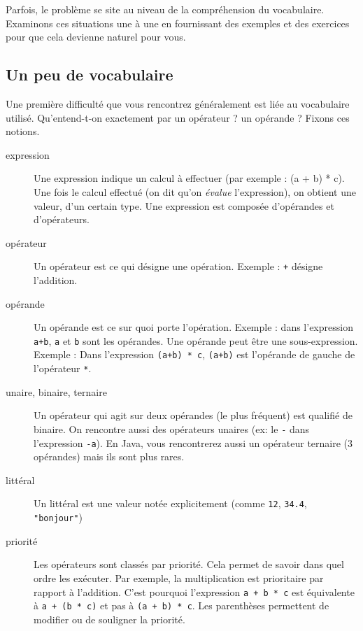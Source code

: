 		Parfois, le problème se site au niveau de la compréhension du vocabulaire.
		Examinons ces situations une à une
		en fournissant des exemples et des exercices
		pour que cela devienne naturel pour vous.

		\subsection{Un peu de vocabulaire}

			Une première difficulté que vous rencontrez généralement 
			est liée au vocabulaire utilisé. 
			Qu'entend-t-on exactement par un opérateur ? un opérande ? 
			Fixons ces notions.
			
			\begin{description}
			\item[expression]
				Une expression indique un calcul à effectuer
				(par exemple : (a + b) * c).
				Une fois le calcul effectué
				(on dit qu'on \emph{évalue} l'expression), 
				on obtient une valeur, d'un certain type.
				Une expression est composée d'opérandes et d'opérateurs.
			\item[opérateur]
				Un opérateur est ce qui désigne une opération.
				Exemple : \Verb_+_ désigne l'addition.
			\item[opérande]
				Un opérande est ce sur quoi porte l'opération.
				Exemple : dans l'expression \Verb_a+b_, 
				\Verb_a_ et \Verb_b_ sont les opérandes.
				Une opérande peut être une sous-expression.
				Exemple : Dans l'expression \Verb_(a+b) * c_, 
				\Verb_(a+b)_ est l'opérande 
				de gauche de l'opérateur \Verb_*_.
			\item[unaire, binaire, ternaire]
				Un opérateur qui agit sur deux opérandes (le plus fréquent)
				est qualifié de binaire. 
				On rencontre aussi des opérateurs unaires (ex: le \Verb_-_ 
				dans l'expression \Verb_-a_).
				En Java, vous rencontrerez aussi un opérateur ternaire (3 opérandes)
				mais ils sont plus rares.
			\item[littéral]
				Un littéral est une valeur notée explicitement 
				(comme \Verb_12_, \Verb_34.4_, \Verb_"bonjour"_)
			\item[priorité]
				Les opérateurs sont classés par priorité. 
				Cela permet de savoir dans quel ordre les exécuter.
				Par exemple, la multiplication est prioritaire par rapport à l'addition.
				C'est pourquoi l'expression \Verb_a + b * c_ 
				est équivalente à \Verb_a + (b * c)_ et pas à \Verb_(a + b) * c_.
				Les parenthèses permettent de modifier ou de souligner la priorité.
			\end{description}
			
